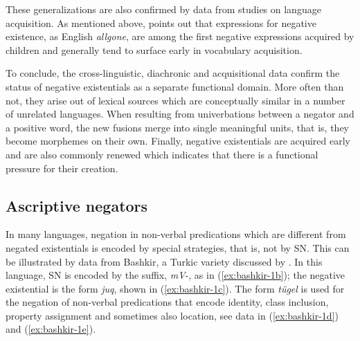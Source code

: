\documentclass[output=paper,chinesefont,colorlinks,citecolor=brown]{langscibook}
\begin{document}
These generalizations are also confirmed by data from studies on language acquisition. As mentioned above, \citet[42--44]{dimrothAcquisitionNegation2010} points out that expressions for negative existence, as English \textit{allgone}, are among the first negative expressions acquired by children and generally tend to surface early in vocabulary acquisition.

To conclude, the cross-linguistic, diachronic and acquisitional data confirm the status of negative existentials as a separate functional domain. More often than not, they arise out of lexical sources which are conceptually similar in a number of unrelated languages. When resulting from univerbations between a negator and a positive word, the new fusions merge into single meaningful units, that is, they become morphemes on their own. Finally, negative existentials are acquired early and are also commonly renewed which indicates that there is a functional pressure for their creation.

\subsection{Ascriptive negators} \label{section:ascriptiveneg}\label{sec:intro:2.4}
In many languages, negation in non-verbal predications which are different from negated existentials is encoded by special strategies, that is, not by SN. This can be illustrated by data from Bashkir, a Turkic variety discussed by . In this language, SN is encoded by the suffix, \textit{mV}-, as in (\ref{ex:bashkir-1b}); the negative existential is the form \textit{juq}, shown in (\ref{ex:bashkir-1c}). The form \textit{tügel} is used for the negation of non-verbal predications that encode identity, class inclusion, property assignment and sometimes also location, see data in (\ref{ex:bashkir-1d}) and (\ref{ex:bashkir-1e}).
\end{document}
